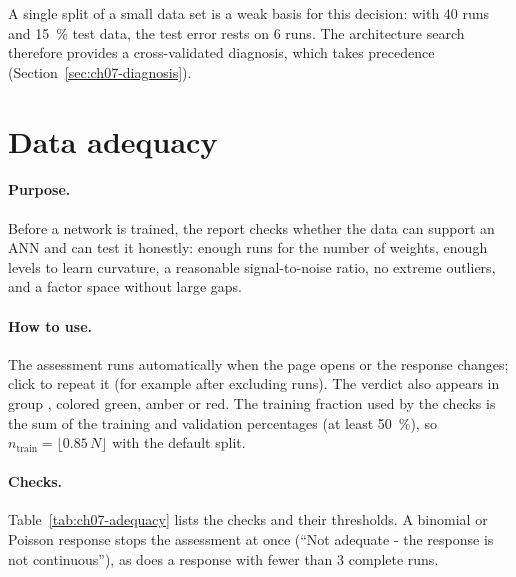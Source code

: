 A single split of a small data set is a weak basis for this decision: with 40 runs and 15~\% test data, the test
error rests on 6 runs. The architecture search therefore provides a cross-validated diagnosis, which takes
precedence (Section~\ref{sec:ch07-diagnosis}).

\section{Data adequacy}\label{sec:ch07-adequacy}

\paragraph{Purpose.} Before a network is trained, the  report checks whether the data can
support an ANN and can test it honestly: enough runs for the number of weights, enough levels to learn curvature,
a reasonable signal-to-noise ratio, no extreme outliers, and a factor space without large gaps.

\paragraph{How to use.} The assessment runs automatically when the page opens or the response changes; click
 to repeat it (for example after excluding runs). The verdict also appears in group
, colored green, amber or red. The training fraction used by the checks is the sum of the
training and validation percentages (at least 50~\%), so $n_\text{train} = \lfloor 0.85\,N\rfloor$ with the
default split.

\paragraph{Checks.} Table~\ref{tab:ch07-adequacy} lists the checks and their thresholds. A binomial or Poisson
response stops the assessment at once (``Not adequate - the response is not continuous''), as does a response with
fewer than 3 complete runs.

